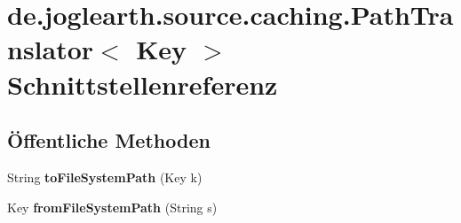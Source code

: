 \section{de.\-joglearth.\-source.\-caching.\-Path\-Translator$<$ Key $>$ Schnittstellenreferenz}
\label{interfacede_1_1joglearth_1_1source_1_1caching_1_1_path_translator_3_01_key_01_4}
\subsection*{Öffentliche Methoden}
\begin{DoxyCompactItemize}
\item 
String {\bfseries to\-File\-System\-Path} (Key k)\label{interfacede_1_1joglearth_1_1source_1_1caching_1_1_path_translator_3_01_key_01_4_ac35bce7cdc48585d135c7ea2b55d9509}

\item 
Key {\bfseries from\-File\-System\-Path} (String s)\label{interfacede_1_1joglearth_1_1source_1_1caching_1_1_path_translator_3_01_key_01_4_a6fea337e909602766e8796884c3e969b}

\end{DoxyCompactItemize}
